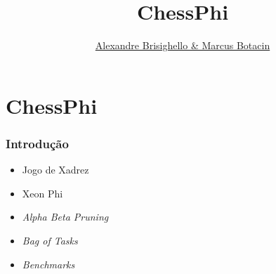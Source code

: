 \documentclass[yellow]{beamer}
\title{ChessPhi}
\author{\underline{Alexandre Brisighello \& Marcus Botacin}}
\begin{document}
\frame{
	\titlepage
}



\section{ChessPhi}


\begin{frame}
  \frametitle{Introdução}

\begin{itemize}
\item Jogo de Xadrez
\item Xeon Phi
\item \textit{Alpha Beta Pruning}
\item \textit{Bag of Tasks}
\item \textit{Benchmarks}
\end{itemize}
\end{frame}

%
%
\end{document}
